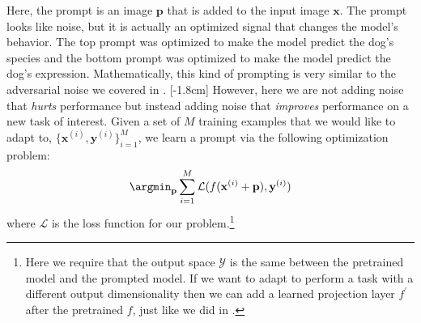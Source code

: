 Here, the prompt is an image $\mathbf{p}$ that is added to the input image $\mathbf{x}$. The prompt looks like noise, but it is actually an optimized signal that changes the model's behavior. The top prompt was optimized to make the model predict the dog's species and the bottom prompt was optimized to make the model predict the dog's expression. Mathematically, this kind of prompting is very similar to the adversarial noise we covered in \sect{\ref{sec:bias_and_shift:adversarial_attacks}}. [-1.8cm]
However, here we are not adding noise that \textit{hurts} performance but instead adding noise that \textit{improves} performance on a new task of interest. Given a set of $M$ training examples that we would like to adapt to, $\{\mathbf{x}^{(i)}, \mathbf{y}^{(i)}\}_{i=1}^M$, we learn a prompt via the following optimization problem:
\begin{align}
    \argmin_{\mathbf{p}} \sum_{i=1}^M \mathcal{L}(f(\mathbf{x}^{(i)} + \mathbf{p}), \mathbf{y}^{(i)})
\end{align}
where $\mathcal{L}$ is the loss function for our problem.\footnote{Here we require that the output space $\mathcal{Y}$ is the same between the pretrained model and the prompted model. If we want to adapt to perform a task with a different output dimensionality then we can add a learned projection layer $f^{\prime}$ after the pretrained $f$, just like we did in \fig{\ref{fig:transfer_learning:finetuning_stages}}.}

